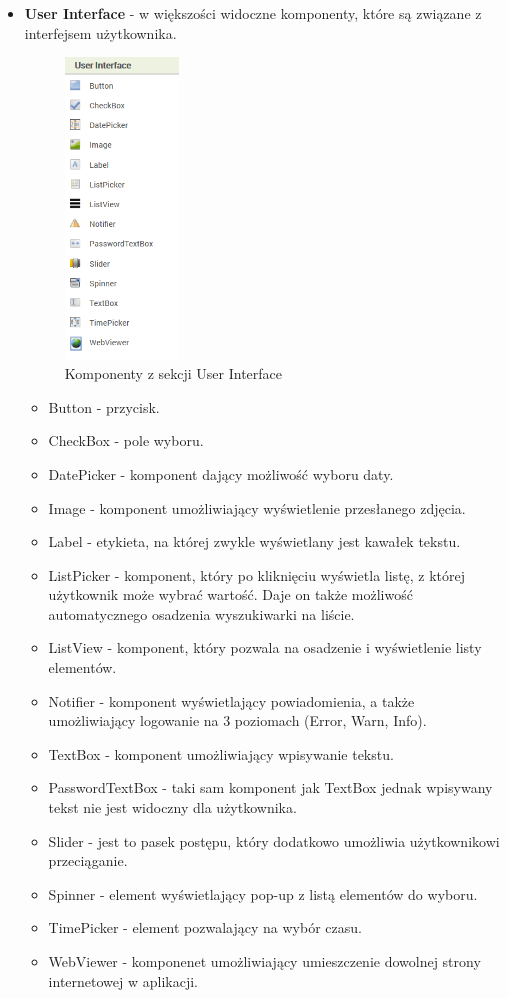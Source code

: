 \begin{itemize}

\item \textbf{User Interface} - w większości widoczne komponenty, które są związane z interfejsem użytkownika.

\begin{figure}[H] 
\centering\includegraphics[height=8cm]{figures/components/userinterface}
\caption{Komponenty z sekcji User Interface}
\end{figure}

\begin{itemize}
\item Button - przycisk.
\item CheckBox - pole wyboru.
\item DatePicker - komponent dający możliwość wyboru daty.
\item Image - komponent umożliwiający wyświetlenie przesłanego zdjęcia.
\item Label - etykieta, na której zwykle wyświetlany jest kawałek tekstu.
\item ListPicker - komponent, który po kliknięciu wyświetla listę, z której użytkownik może wybrać wartość. Daje on także możliwość automatycznego osadzenia wyszukiwarki na liście.
\item ListView - komponent, który pozwala na osadzenie i wyświetlenie listy elementów.
\item Notifier - komponent wyświetlający powiadomienia, a także umożliwiający logowanie na 3 poziomach (Error, Warn, Info).
\item TextBox - komponent umożliwiający wpisywanie tekstu.
\item PasswordTextBox - taki sam komponent jak TextBox jednak wpisywany tekst nie jest widoczny dla użytkownika.
\item Slider - jest to pasek postępu, który dodatkowo umożliwia użytkownikowi przeciąganie.
\item Spinner - element wyświetlający pop-up z listą elementów do wyboru.
\item TimePicker - element pozwalający na wybór czasu.
\item WebViewer - komponenet umożliwiający umieszczenie dowolnej strony internetowej w aplikacji.
\end{itemize}


\end{itemize}
